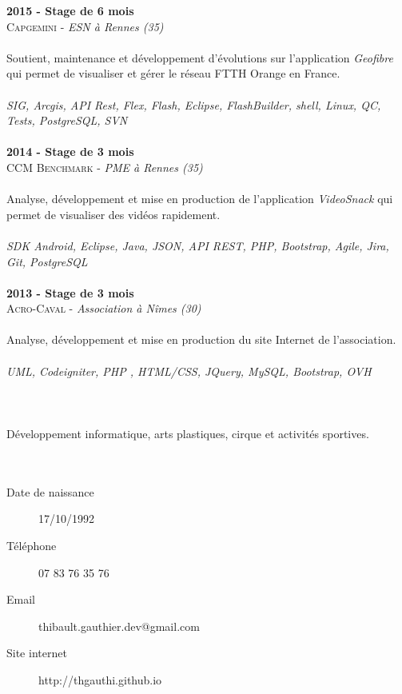 \begin{titlepage}
\begin{minipage}[t]{8.7cm}
    \textbf{2015 - Stage de 6 mois} \\
    \textsc{Capgemini} -
    \textit{ESN à Rennes (35)}
    \\\\Soutient, maintenance et développement d'évolutions sur l'application \textit{Geofibre} qui permet de visualiser et gérer le réseau FTTH Orange en France.
    \\\\\textit{SIG, Arcgis, API Rest, Flex, Flash, Eclipse, FlashBuilder, shell, Linux, QC, Tests, PostgreSQL, SVN}
    \\\\\textbf{2014 - Stage de 3 mois} \\
    \textsc{CCM Benchmark} -
     \textit{PME à Rennes (35)}
    \\\\Analyse, développement et mise en production de l'application \textit{VideoSnack} qui permet de visualiser des vidéos rapidement.
    \\\\\textit{SDK Android, Eclipse, Java, JSON, API REST, PHP, Bootstrap, Agile, Jira, Git, PostgreSQL}
    \\\\\textbf{2013 - Stage de 3 mois} \\
    \textsc{Acro-Caval} -
    \textit{Association à Nîmes (30)}
    \\\\Analyse, développement et mise en production du site Internet de l'association.
    \\\\\textit{UML, Codeigniter, PHP , HTML/CSS, JQuery, MySQL, Bootstrap, OVH}
    \\\\\\\\
    Développement informatique, arts plastiques,
    cirque et activités sportives.
    \\\\\\
    \begin{description}%
      \item[Date de naissance] 17/10/1992
      \item[Téléphone] 07 83 76 35 76
      \item[Email] thibault.gauthier.dev@gmail.com
      \item[Site internet] http://thgauthi.github.io
    \end{description}

  \end{minipage}





  \addtocounter{footnote}{-2} %
\end{titlepage}
